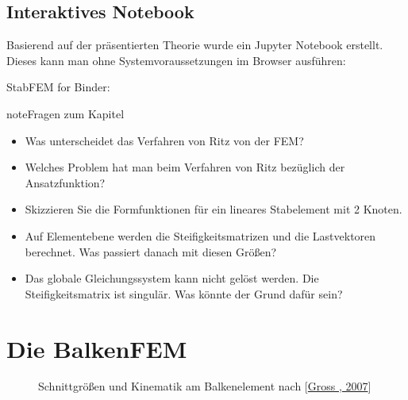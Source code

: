 \documentclass[letterpaper,10pt,german]{jupyterBook}
\let\sphinxpxdimen\pdfpxdimen\else\newdimen\sphinxpxdimen
\begin{document}
\subsection{Interaktives Notebook}
\label{\detokenize{chapters/chapter2/1dFEM:interaktives-notebook}}
\sphinxAtStartPar
Basierend auf der präsentierten Theorie wurde ein Jupyter Notebook erstellt. Dieses kann man ohne Systemvoraussetzungen im Browser ausführen:

\sphinxAtStartPar
StabFEM for Binder: 

\begin{sphinxadmonition}{note}{Fragen zum Kapitel}

\sphinxAtStartPar
{}
\begin{itemize}
\item {} 
\sphinxAtStartPar
Was unterscheidet das Verfahren von Ritz von der FEM?

\item {} 
\sphinxAtStartPar
Welches Problem hat man beim Verfahren von Ritz bezüglich der Ansatzfunktion?

\item {} 
\sphinxAtStartPar
Skizzieren Sie die Formfunktionen für ein lineares Stabelement mit 2 Knoten.

\item {} 
\sphinxAtStartPar
Auf Elementebene werden die Steifigkeitsmatrizen und die Lastvektoren berechnet. Was passiert danach mit diesen Größen?

\item {} 
\sphinxAtStartPar
Das globale Gleichungssystem kann nicht gelöst werden. Die Steifigkeitsmatrix ist singulär. Was könnte der Grund dafür sein?

\end{itemize}
\end{sphinxadmonition}

\sphinxstepscope




\section{Die Balken\sphinxhyphen{}FEM}
\label{\detokenize{chapters/chapter2/BalkenFEM:die-balken-fem}}\label{\detokenize{chapters/chapter2/BalkenFEM::doc}}
\begin{figure}[htbp]
\centering
\capstart

\noindent\sphinxincludegraphics[height=400\sphinxpxdimen]{{Balken_TM21}.png}
\caption{Schnittgrößen und Kinematik am Balkenelement nach {[}\hyperlink{cite.quellen:id13}{Gross , 2007}{]}}\label{\detokenize{chapters/chapter2/BalkenFEM:balken02}}\end{figure}
\end{document}
